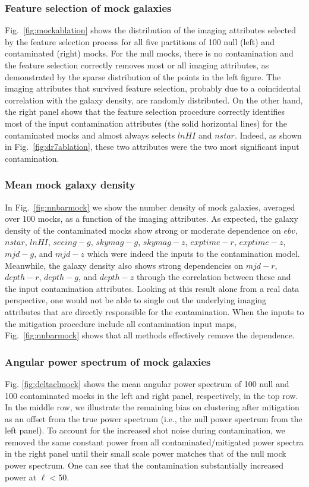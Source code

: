 \documentclass[fleqn, usenatbib]{mnras}
\begin{document}
\subsubsection{Feature selection of mock galaxies}
Fig.~\ref{fig:mockablation} shows the distribution of the imaging attributes selected by the feature selection process for all five partitions of 100 null (left) and contaminated (right) mocks. For the null mocks, there is no contamination and the feature selection correctly removes most or all imaging attributes, as demonstrated by the sparse distribution of the points in the left figure. The imaging attributes that survived feature selection, probably due to a coincidental correlation with the galaxy density, are randomly distributed. On the other hand, the right panel shows that the feature selection procedure correctly identifies most of the input contamination attributes (the solid horizontal lines) for the contaminated mocks and almost always selects $lnHI$ and $nstar$. Indeed, as shown in Fig.~\ref{fig:dr7ablation}, these two attributes were the two most significant input contamination.


\subsubsection{Mean mock galaxy density}
In Fig.~\ref{fig:nnbarmock} we show the number density of mock galaxies, averaged over 100 mocks, as a function of the imaging attributes. As expected, the galaxy density of the contaminated mocks show strong or moderate dependence on $ebv$, $nstar$, $lnHI$, $seeing-g$, $skymag-g$, $skymag-z$, $exptime-r$, $exptime-z$, $mjd-g$, and $mjd-z$ which were indeed the inputs to the contamination model. Meanwhile, the galaxy density also shows strong dependencies on $mjd-r$, $depth-r$, $depth-g$, and $depth-z$ through the correlation between these and the input contamination attributes. Looking at this result alone from a real data perspective, one would not be able to single out the underlying imaging attributes that are directly responsible for the contamination. When the inputs to the mitigation procedure include all contamination input maps, Fig.~\ref{fig:nnbarmock} shows that all methods effectively remove the dependence.\\
 

 
\subsubsection{Angular power spectrum of mock galaxies}
Fig. \ref{fig:deltaclmock} shows the mean angular power spectrum of 100 null and 100 contaminated mocks in the left and right panel, respectively, in the top row. In the middle row, we illustrate the remaining bias on clustering after mitigation as an offset from the true power spectrum (i.e., the null power spectrum from the left panel). To account for the increased shot noise during contamination, we removed the same constant power from all contaminated/mitigated power spectra in the right panel until their small scale power matches that of the null mock power spectrum. One can see that the contamination substantially increased power at $\ell < 50$.\\
\end{document}
